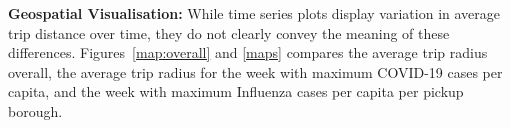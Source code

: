 \documentclass[11pt]{article}
\begin{document}


    \textbf{Geospatial Visualisation:}
While time series plots display variation in average trip distance over time, 
they do not clearly convey the meaning of these differences.
Figures~\ref{map:overall} and \ref{maps} compares the average trip radius overall, 
the average trip radius for the week with maximum COVID-19 cases per capita, 
and the week with maximum Influenza cases per capita per pickup borough.
\end{document}
